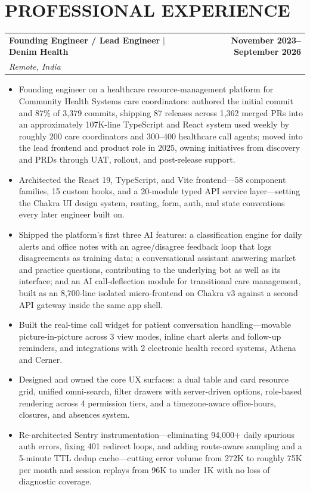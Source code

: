 \documentclass[10pt,a4paper]{article}
\makeatletter
\newcommand{\role}[4]{%
  \Needspace*{5\baselineskip}%
  \begin{tabularx}{\textwidth}{@{}Xr@{}}
    \textbf{\color{ink}#1} $\mid$ \textbf{#2} & \textbf{#3} \\
    \textit{#4} &
  \end{tabularx}\vspace{-4pt}
}
\makeatother
\begin{document}
\section{PROFESSIONAL EXPERIENCE}
\role{Founding Engineer / Lead Engineer}{Denim Health}{November 2023--September 2026}{Remote, India}
\begin{itemize}
  \item Founding engineer on a healthcare resource-management platform for Community Health Systems care coordinators: authored the initial commit and 87\% of 3,379 commits, shipping 87 releases across 1,362 merged PRs into an approximately 107K-line TypeScript and React system used weekly by roughly 200 care coordinators and 300--400 healthcare call agents; moved into the lead frontend and product role in 2025, owning initiatives from discovery and PRDs through UAT, rollout, and post-release support.
  \item Architected the React 19, TypeScript, and Vite frontend---58 component families, 15 custom hooks, and a 20-module typed API service layer---setting the Chakra UI design system, routing, form, auth, and state conventions every later engineer built on.
  \item Shipped the platform's first three AI features: a classification engine for daily alerts and office notes with an agree/disagree feedback loop that logs disagreements as training data; a conversational assistant answering market and practice questions, contributing to the underlying bot as well as its interface; and an AI call-deflection module for transitional care management, built as an 8,700-line isolated micro-frontend on Chakra v3 against a second API gateway inside the same app shell.
  \item Built the real-time call widget for patient conversation handling---movable picture-in-picture across 3 view modes, inline chart alerts and follow-up reminders, and integrations with 2 electronic health record systems, Athena and Cerner.
  \item Designed and owned the core UX surfaces: a dual table and card resource grid, unified omni-search, filter drawers with server-driven options, role-based rendering across 4 permission tiers, and a timezone-aware office-hours, closures, and absences system.
  \item Re-architected Sentry instrumentation---eliminating 94,000+ daily spurious auth errors, fixing 401 redirect loops, and adding route-aware sampling and a 5-minute TTL dedup cache---cutting error volume from 272K to roughly 75K per month and session replays from 96K to under 1K with no loss of diagnostic coverage.

\end{itemize}
\end{document}
